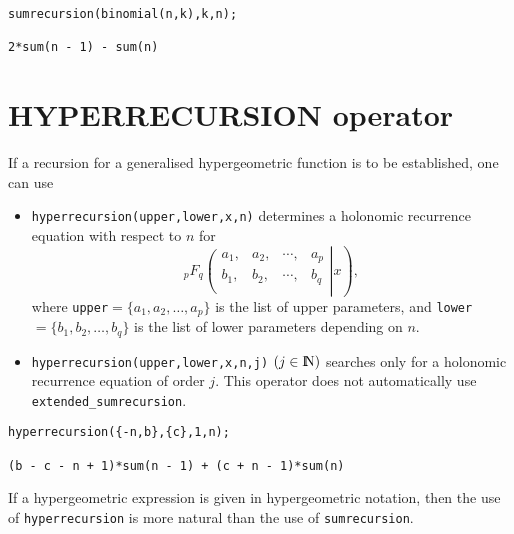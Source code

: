 \begin{verbatim}
sumrecursion(binomial(n,k),k,n);

2*sum(n - 1) - sum(n)
\end{verbatim}


\section{HYPERRECURSION operator}

If a recursion for a generalised hypergeometric function is to be
established, one can use
\begin{itemize}
\item
{\tt hyperrecursion(upper,lower,x,n)}
determines a holonomic recurrence  equation with respect to $n$ for 
\[_{p}F_{q}\left.\left(\begin{array}{cccc}
a_{1},&a_{2},&\cdots,&a_{p}\\
b_{1},&b_{2},&\cdots,&b_{q}\\
            \end{array}\right| x\right) ,
\] where {\tt upper}$=\{a_{1}, a_{2}, \ldots, a_{p}\}$
is the list of upper parameters, and 
{\tt lower}$=\{b_{1}, b_{2}, \ldots, b_{q}\}$
is the list of lower parameters depending on $n$.
\item
{\tt hyperrecursion(upper,lower,x,n,j)} $(j\in\N)$
searches only for a holonomic recurrence equation of order $j$.  This
operator does not automatically use {\tt extended\_sumrecursion}.
\end{itemize}

\begin{verbatim}
hyperrecursion({-n,b},{c},1,n);

(b - c - n + 1)*sum(n - 1) + (c + n - 1)*sum(n)
\end{verbatim}

If a hypergeometric expression is given in hypergeometric notation, then
the use of {\tt hyperrecursion} is more natural than the use of
{\tt sumrecursion}.

